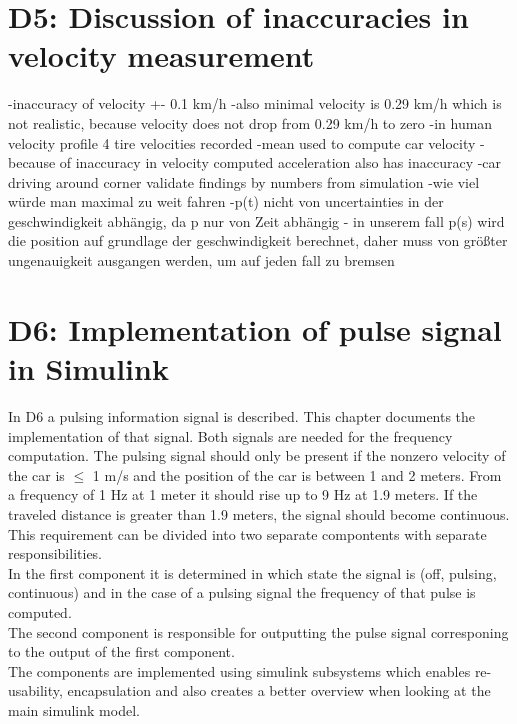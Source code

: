\chapter{D5: Discussion of inaccuracies in velocity measurement}\label{cha:D5}
-inaccuracy of velocity +- 0.1 km/h
-also minimal velocity is 0.29 km/h which is not realistic, because velocity does not drop from 0.29 km/h to zero
-in human velocity profile 4 tire velocities recorded
-mean used to compute car velocity
-because of inaccuracy in velocity computed acceleration also has inaccuracy
-car driving around corner
validate findings by numbers from simulation
-wie viel würde man maximal zu weit fahren
-p(t) nicht von uncertainties in der geschwindigkeit abhängig, da p nur von Zeit abhängig 
- in unserem fall p(s) wird die position auf grundlage der geschwindigkeit berechnet, daher muss von größter ungenauigkeit ausgangen werden, um auf jeden fall zu bremsen

\chapter{D6: Implementation of pulse signal in Simulink}\label{cha:D6}

In D6 a pulsing information signal is described. This chapter documents the implementation of that signal.
Both signals are needed for the frequency computation.
The pulsing signal should only be present if the nonzero velocity of the car is $\leq$ 1 m/s and the position of the car is between 1 and 2 meters. From a frequency of 1 Hz at 1 meter it should rise up to 9 Hz at 1.9 meters. If the traveled distance is greater than 1.9 meters, the signal should become continuous.\\
This requirement can be divided into two separate compontents with separate responsibilities.\\
In the first component it is determined in which state the signal is (off, pulsing, continuous) and in the case of a pulsing signal the frequency of that pulse is computed.\\
The second component is responsible for outputting the pulse signal corresponing to the output of the first component.\\
The components are implemented using simulink subsystems which enables re-usability, encapsulation and also creates a better overview when looking at the main simulink model.\\
